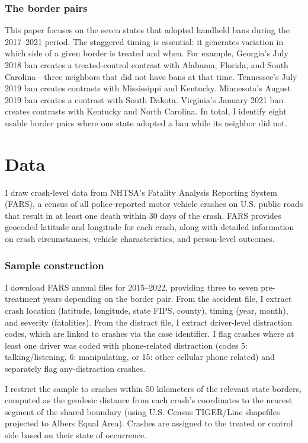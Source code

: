 \documentclass[12pt]{article}
\begin{document}
\subsubsection*{The border pairs} This paper focuses on the seven states that adopted handheld bans during the 2017--2021 period. The staggered timing is essential: it generates variation in which side of a given border is treated and when. For example, Georgia's July 2018 ban creates a treated-control contrast with Alabama, Florida, and South Carolina---three neighbors that did not have bans at that time. Tennessee's July 2019 ban creates contrasts with Mississippi and Kentucky. Minnesota's August 2019 ban creates a contrast with South Dakota. Virginia's January 2021 ban creates contrasts with Kentucky and North Carolina. In total, I identify eight usable border pairs where one state adopted a ban while its neighbor did not.


\section{Data}

I draw crash-level data from NHTSA's Fatality Analysis Reporting System (FARS), a census of all police-reported motor vehicle crashes on U.S. public roads that result in at least one death within 30 days of the crash. FARS provides geocoded latitude and longitude for each crash, along with detailed information on crash circumstances, vehicle characteristics, and person-level outcomes.

\subsubsection*{Sample construction} I download FARS annual files for 2015--2022, providing three to seven pre-treatment years depending on the border pair. From the accident file, I extract crash location (latitude, longitude, state FIPS, county), timing (year, month), and severity (fatalities). From the distract file, I extract driver-level distraction codes, which are linked to crashes via the case identifier. I flag crashes where at least one driver was coded with phone-related distraction (codes 5: talking/listening, 6: manipulating, or 15: other cellular phone related) and separately flag any-distraction crashes.

I restrict the sample to crashes within 50 kilometers of the relevant state borders, computed as the geodesic distance from each crash's coordinates to the nearest segment of the shared boundary (using U.S. Census TIGER/Line shapefiles projected to Albers Equal Area). Crashes are assigned to the treated or control side based on their state of occurrence.
\end{document}

